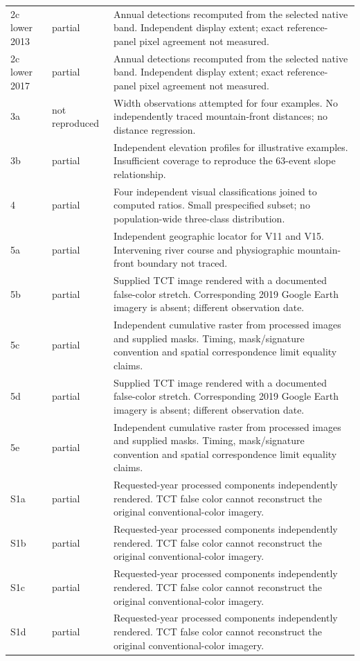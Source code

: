 \begin{longtable}{p{.12\linewidth}p{.16\linewidth}p{.64\linewidth}}
2c lower 2013 & partial & Annual detections recomputed from the selected native band. Independent display extent; exact reference-panel pixel agreement not measured.\\
2c lower 2017 & partial & Annual detections recomputed from the selected native band. Independent display extent; exact reference-panel pixel agreement not measured.\\
3a & not reproduced & Width observations attempted for four examples. No independently traced mountain-front distances; no distance regression.\\
3b & partial & Independent elevation profiles for illustrative examples. Insufficient coverage to reproduce the 63-event slope relationship.\\
4 & partial & Four independent visual classifications joined to computed ratios. Small prespecified subset; no population-wide three-class distribution.\\
5a & partial & Independent geographic locator for V11 and V15. Intervening river course and physiographic mountain-front boundary not traced.\\
5b & partial & Supplied TCT image rendered with a documented false-color stretch. Corresponding 2019 Google Earth imagery is absent; different observation date.\\
5c & partial & Independent cumulative raster from processed images and supplied masks. Timing, mask/signature convention and spatial correspondence limit equality claims.\\
5d & partial & Supplied TCT image rendered with a documented false-color stretch. Corresponding 2019 Google Earth imagery is absent; different observation date.\\
5e & partial & Independent cumulative raster from processed images and supplied masks. Timing, mask/signature convention and spatial correspondence limit equality claims.\\
S1a & partial & Requested-year processed components independently rendered. TCT false color cannot reconstruct the original conventional-color imagery.\\
S1b & partial & Requested-year processed components independently rendered. TCT false color cannot reconstruct the original conventional-color imagery.\\
S1c & partial & Requested-year processed components independently rendered. TCT false color cannot reconstruct the original conventional-color imagery.\\
S1d & partial & Requested-year processed components independently rendered. TCT false color cannot reconstruct the original conventional-color imagery.\\

\end{longtable}
